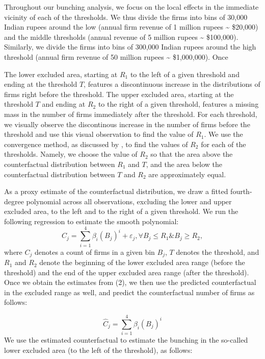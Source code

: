 Throughout our bunching analysis, we focus on the local effects in
the immediate vicinity of each of the thresholds. We thus divide the
firms into bins of 30,000 Indian rupees around the low (annual firm
revenue of 1 million rupees \textasciitilde{} \$20,000) and the middle
thresholds (annual revenue of 5 million rupees \textasciitilde{} \$100,000).
Similarly, we divide the firms into bins of 300,000 Indian rupees
around the high threshold (annual firm revenue of 50 million rupees
\textasciitilde{} \$1,000,000). Once

The lower excluded area, starting at $R_{1}$ to the left of a given
threshold and ending at the threshold $T$, features a discontinuous
increase in the distributions of firms right before the threshold.
The upper excluded area, starting at the threshold $T$ and ending
at $R_{2}$ to the right of a given threshold, features a missing
mass in the number of firms immediately after the threshold. For each
threshold, we visually observe the discontinous increase in the number
of firms before the threshold and use this visual observation to find
the value of $R_{1}$. We use the convergence method, as discussed
by \citet{kleven2013using}, to find the values of $R_{2}$ for each
of the thresholds. Namely, we choose the value of $R_{2}$ so that
the area above the counterfactual distribution between $R_{1}$ and
$T$, and the area below the counterfactual distribution between $T$
and $R_{2}$ are approximately equal.

As a proxy estimate of the counterfactual distribution, we draw a
fitted fourth-degree polynomial across all observations, excluding
the lower and upper excluded area, to the left and to the right of
a given threshold. We run the following regression to estimate the
smooth polynomial: 
\begin{equation}
C_{j}=\sum_{i=1}^{4}\beta_{i}(B_{j})^{i}+\varepsilon_{j},\forall B_{j}\leq R_{1}\&B_{j}\geq R_{2},
\end{equation}
where $C_{j}$ denotes a count of firms in a given bin $B_{j}$, $T$
denotes the threshold, and $R_{1}$ and $R_{2}$ denote the beginning
of the lower excluded area range (before the threshold) and the end
of the upper excluded area range (after the threshold). Once we obtain
the estimates from (2), we then use the predicted counterfactual in
the excluded range as well, and predict the counterfactual number
of firms as follows:

\[
\hat{C}_{j}=\sum_{i=1}^{4}\beta_{i}(B_{j})^{i}
\]
We use the estimated counterfactual to estimate the bunching in the
so-called lower excluded area (to the left of the threshold), as follows:

